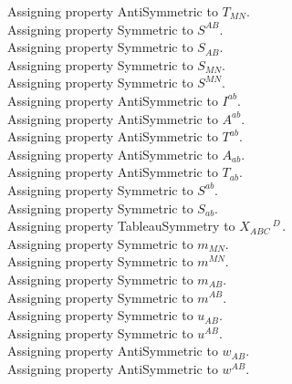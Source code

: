 \documentclass[11pt]{article}
\begin{document}
Assigning property AntiSymmetric to ${T}_{M N}$.
\\
Assigning property Symmetric to ${S}^{A B}$.
\\
Assigning property Symmetric to ${S}_{A B}$.
\\
Assigning property Symmetric to ${S}_{M N}$.
\\
Assigning property Symmetric to ${S}^{M N}$.
\\
Assigning property AntiSymmetric to ${I}^{a b}$.
\\
Assigning property AntiSymmetric to ${A}^{a b}$.
\\
Assigning property AntiSymmetric to ${T}^{a b}$.
\\
Assigning property AntiSymmetric to ${A}_{a b}$.
\\
Assigning property AntiSymmetric to ${T}_{a b}$.
\\
Assigning property Symmetric to ${S}^{a b}$.
\\
Assigning property Symmetric to ${S}_{a b}$.
\\
Assigning property TableauSymmetry to ${X}_{A B C}\,^{D\, }$.
\\
Assigning property Symmetric to ${m}_{M N}$.
\\
Assigning property Symmetric to ${m}^{M N}$.
\\
Assigning property Symmetric to ${m}_{A B}$.
\\
Assigning property Symmetric to ${m}^{A B}$.
\\
Assigning property Symmetric to ${u}_{A B}$.
\\
Assigning property Symmetric to ${u}^{A B}$.
\\
Assigning property AntiSymmetric to ${w}_{A B}$.
\\
Assigning property AntiSymmetric to ${w}^{A B}$.
\end{document}
